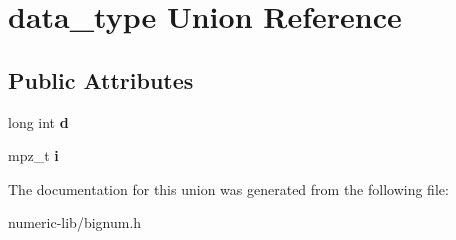\hypertarget{uniondata__type}{\section{data\-\_\-type \-Union \-Reference}
\label{uniondata__type}
}
\subsection*{\-Public \-Attributes}
\begin{DoxyCompactItemize}
\item 
\hypertarget{uniondata__type_aca3953e2a01cbed3aacfbe4a4c1ac34e}{long int {\bfseries d}}\label{uniondata__type_aca3953e2a01cbed3aacfbe4a4c1ac34e}

\item 
\hypertarget{uniondata__type_abfeb2a93b035f875d6049f87f482c656}{mpz\-\_\-t {\bfseries i}}\label{uniondata__type_abfeb2a93b035f875d6049f87f482c656}

\end{DoxyCompactItemize}


\-The documentation for this union was generated from the following file\-:\begin{DoxyCompactItemize}
\item 
numeric-\/lib/bignum.\-h\end{DoxyCompactItemize}
